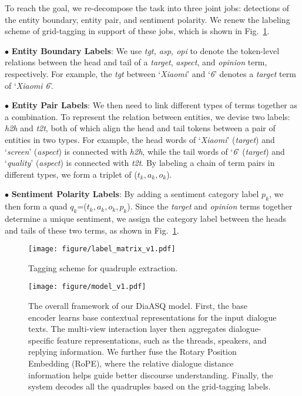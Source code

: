 \documentclass[11pt]{article}
\begin{document}
To reach the goal, we re-decompose the task into three joint jobs: detections of the entity boundary, entity pair, and sentiment polarity.
We renew the labeling scheme of grid-tagging in support of these jobs, which is shown in Fig.~\ref{fig:matrix}.

\vspace{2pt}
$\bullet$ \textbf{Entity Boundary Labels}:
We use \textit{tgt, asp, opi} to denote the token-level relations between the head and tail of a \emph{target}, \emph{aspect}, and \emph{opinion} term, respectively.
For example, the \textit{tgt} between `\emph{Xiaomi}' and `\emph{6}' denotes a \emph{target} term of `\emph{Xiaomi 6}'.

\vspace{2pt}
$\bullet$ \textbf{Entity Pair Labels}:
We then need to link different types of terms together as a combination.
To represent the relation between entities, we devise two labels: \emph{h2h} and \emph{t2t}, both of which align the head and tail tokens between a pair of entities in two types.
For example, the head words of `\emph{Xiaomi}' (\emph{target}) and `\emph{screen}' (\emph{aspect}) is connected with \emph{h2h}, while the tail words of `\emph{6}' (\emph{target}) and `\emph{quality}' (\emph{aspect}) is connected with \emph{t2t}.
By labeling a chain of term pairs in different types, we form a triplet of ($t_k, a_k, o_k$).

\vspace{2pt}
$\bullet$ \textbf{Sentiment Polarity Labels}:
By adding a sentiment category label $p_k$, we then form a quad $q_k$=($t_k, a_k, o_k, p_k$).
Since the \emph{target} and \emph{opinion} terms together determine a unique sentiment, we assign the category label between the heads and tails of these two terms, as shown in Fig.~\ref{fig:matrix}.

\begin{figure}[!t]
  \centering
  \texttt{[image: figure/label\_matrix\_v1.pdf]}
  \caption{Tagging scheme for quadruple extraction. }
  \label{fig:matrix}
  \vspace{-4mm}
\end{figure}

\begin{figure*}[!t]
\centering
\texttt{[image: figure/model\_v1.pdf]}
\caption{
The overall framework of our DiaASQ model.
First, the base encoder learns base contextual representations for the input dialogue texts.
The multi-view interaction layer then aggregates dialogue-specific feature representations, such as the threads, speakers, and replying information.
We further fuse the Rotary Position Embedding (RoPE), where the relative dialogue distance information helps guide better discourse understanding. 
Finally, the system decodes all the quadruples based on the grid-tagging labels.
}
\label{fig:model}
\vspace{-5pt}
\end{figure*}
\end{document}
